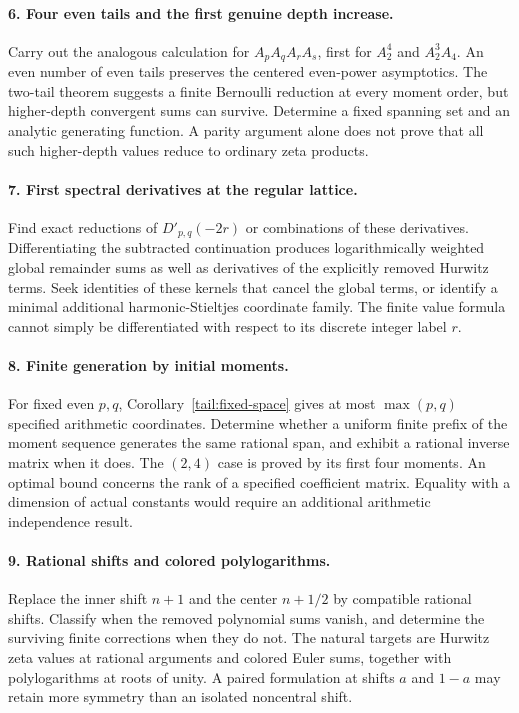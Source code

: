 \documentclass[11pt,a4paper]{article}
\numberwithin{equation}{section}
\theoremstyle{definition}
\theoremstyle{remark}
\begin{document}
\paragraph{6. Four even tails and the first genuine depth increase.}
Carry out the analogous calculation for
$A_pA_qA_rA_s$, first for $A_2^4$ and $A_2^3A_4$.
An even number of even tails preserves the centered even-power
asymptotics. The two-tail theorem suggests a finite Bernoulli
reduction at every moment order, but higher-depth convergent sums
can survive. Determine a fixed spanning set and an analytic
generating function. A parity argument alone does not prove that
all such higher-depth values reduce to ordinary zeta products.

\paragraph{7. First spectral derivatives at the regular lattice.}
Find exact reductions of $D'_{p,q}(-2r)$ or combinations of these
derivatives. Differentiating the subtracted continuation produces
logarithmically weighted global remainder sums as well as
derivatives of the explicitly removed Hurwitz terms. Seek
identities of these kernels that cancel the global terms, or
identify a minimal additional harmonic-Stieltjes coordinate
family. The finite value formula cannot simply be differentiated
with respect to its discrete integer label $r$.

\paragraph{8. Finite generation by initial moments.}
For fixed even $p,q$, Corollary~\ref{tail:fixed-space} gives at
most $\max(p,q)$ specified arithmetic coordinates. Determine
whether a uniform finite prefix of the moment sequence generates
the same rational span, and exhibit a rational inverse matrix when
it does. The $(2,4)$ case is proved by its first four moments.
An optimal bound concerns the rank of a specified coefficient
matrix. Equality with a dimension of actual constants would require
an additional arithmetic independence result.

\paragraph{9. Rational shifts and colored polylogarithms.}
Replace the inner shift $n+1$ and the center $n+1/2$ by compatible
rational shifts. Classify when the removed polynomial sums vanish,
and determine the surviving finite corrections when they do not.
The natural targets are Hurwitz zeta values at rational arguments
and colored Euler sums, together with polylogarithms at roots of
unity. A paired formulation at shifts $a$ and $1-a$ may retain
more symmetry than an isolated noncentral shift.
\end{document}
